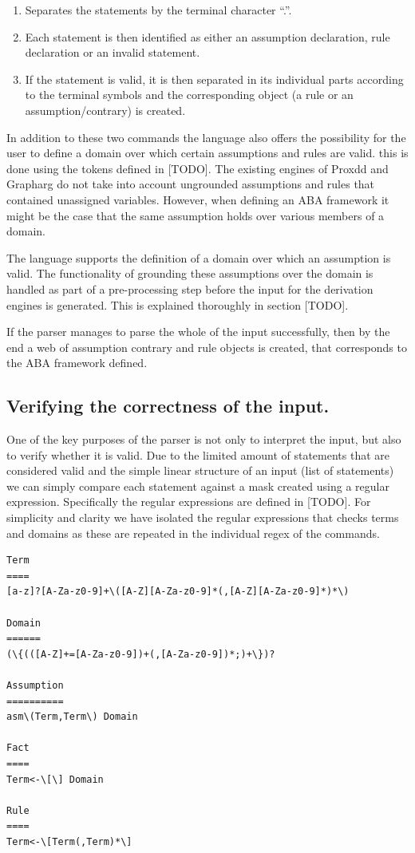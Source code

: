 \begin{enumerate}
\item Separates the statements by the terminal character ``.''.
\item Each statement is then identified as either an assumption declaration, rule declaration or an invalid statement.
\item If the statement is valid, it is then separated in its individual parts according to the terminal symbols and the corresponding object (a rule or an assumption/contrary) is created.
\end{enumerate}

In addition to these two commands the language also offers the possibility for the user to define a domain over which certain assumptions and rules are valid. this is done using the tokens defined in [TODO]. The existing engines of Proxdd and Grapharg do not take into account ungrounded assumptions and rules that contained unassigned variables. However, when defining an ABA framework it might be the case that the same assumption holds over various members of a domain.

The language supports the definition of a domain over which an assumption is valid. The functionality of grounding these assumptions over the domain is handled as part of a pre-processing step before the input for the derivation engines is generated. This is explained thoroughly in section [TODO].

If the parser manages to parse the whole of the input successfully, then by the end a web of assumption contrary and rule objects is created, that corresponds to the ABA framework defined.

\subsection{Verifying the correctness of the input.}

One of the key purposes of the parser is not only to interpret the input, but also to verify whether it is valid. Due to the limited amount of statements that are considered valid and the simple linear structure of an input (list of statements) we can simply compare each statement against a mask created using a regular expression. Specifically the regular expressions are defined in [TODO]. For simplicity and clarity we have isolated the regular expressions that checks terms and domains as these are repeated in the individual regex of the commands.

\begin{Verbatim}[frame=single]
Term
====
[a-z]?[A-Za-z0-9]+\([A-Z][A-Za-z0-9]*(,[A-Z][A-Za-z0-9]*)*\)

Domain
======
(\{(([A-Z]+=[A-Za-z0-9])+(,[A-Za-z0-9])*;)+\})?

Assumption
==========
asm\(Term,Term\) Domain	

Fact
====
Term<-\[\] Domain

Rule
====
Term<-\[Term(,Term)*\]

\end{Verbatim}

